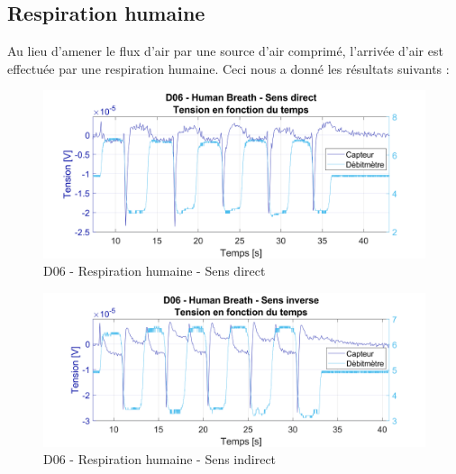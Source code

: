\newpage
\subsection{Respiration humaine}
Au lieu d'amener le flux d'air par une source d'air comprimé, l'arrivée d'air est effectuée par une respiration humaine. Ceci nous a donné les résultats suivants :


\begin{figure}[H]
    \centering
    \includegraphics[scale = 0.5]{assets/figures/D06_hb_direct.svg}
    \caption{D06 - Respiration humaine - Sens direct}
    \label{fig:d06_hb_direct}
\end{figure}
\begin{figure}[H]
    \centering
    \includegraphics[scale = 0.5]{assets/figures/D06_hb_indirect2.svg}
    \caption{D06 - Respiration humaine - Sens indirect}
    \label{fig:d06_hb_indirect}
\end{figure}

